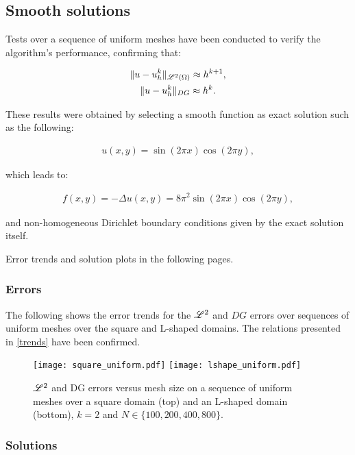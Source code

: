\subsection{Smooth solutions}

Tests over a sequence of uniform meshes have been conducted to verify the algorithm's performance, confirming that:

\begin{gather} \label{trends}
    \lVert u - u^k_h \rVert_{\mathscr{L}^2(\Omega)} \approx h^{k + 1}, \\
    \lVert u - u^k_h \rVert_{DG} \approx h^k.
\end{gather}

These results were obtained by selecting a smooth function as exact solution such as the following:

\begin{gather}
    u(x, y) = \sin(2 \pi x) \cos(2 \pi y),
\end{gather}

which leads to:

\begin{gather}
    f(x, y) = -\Delta u(x, y) = 8 \pi^2 \sin(2 \pi x) \cos(2 \pi y),
\end{gather}

and non-homogeneous Dirichlet boundary conditions given by the exact solution itself.

Error trends and solution plots in the following pages.

\newpage
\subsubsection{Errors}

The following shows the error trends for the $\mathscr{L}^2$ and $DG$ errors over sequences of uniform meshes over the square and L-shaped domains. The relations presented in \eqref{trends} have been confirmed.

\begin{figure}[!ht]
	\centering
	\texttt{[image: square\_uniform.pdf]}
    \texttt{[image: lshape\_uniform.pdf]}
	\caption{$\mathscr{L}^2$ and DG errors versus mesh size on a sequence of uniform meshes over a square domain (top) and an L-shaped domain (bottom), $k = 2$ and $N \in \{100, 200, 400, 800\}$.}
\end{figure}

\newpage
\subsubsection{Solutions}

